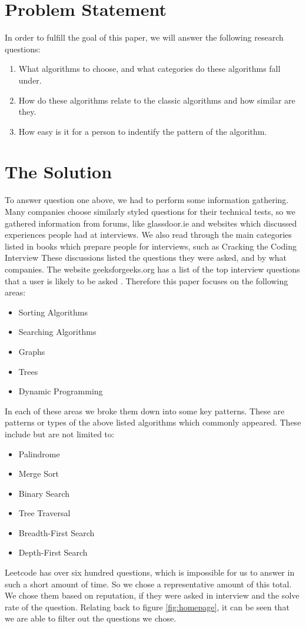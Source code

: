 \documentclass[10pt,twocolumn]{IEEEtran}
\begin{document}
\section{Problem Statement}
In order to fulfill the goal of this paper, we will answer the following research questions:
\begin{enumerate}
\item What algorithms to choose, and what categories do these algorithms fall under. 
\item How do these algorithms relate to the classic algorithms and how similar are they.
\item How easy is it for a person to indentify the pattern of the algorithm.
\end{enumerate}
\section{The Solution}
To answer question one above, we had to perform some information gathering. Many companies choose similarly styled questions for their technical tests, so we gathered information from forums, like glassdoor.ie \cite{glassdoor} and websites which discussed experiences people had at interviews. We also read through the main categories listed in books which prepare people for interviews, such as Cracking the Coding Interview \cite{mcdowell2015cracking} These discussions listed the questions they were asked, and by what companies. The website geeksforgeeks.org has a list of the top interview questions that a user is likely to be asked \cite{geeksalgos}. Therefore this paper focuses on the following areas:
\begin{itemize}
\item Sorting Algorithms
\item Searching Algorithms
\item Graphs
\item Trees
\item Dynamic Programming
\end{itemize}
In each of these areas we broke them down into some key patterns. These are patterns or types of the above listed algorithms which commonly appeared. These include but are not limited to:
\begin{itemize}
\item Palindrome
\item  Merge Sort
\item Binary Search
\item Tree Traversal
\item Breadth-First Search
\item Depth-First Search
\end{itemize} 
\par Leetcode has over six hundred questions, which is impossible for us to answer in such a short amount of time. So we chose a representative amount of this total. We chose them based on reputation, if they were asked in interview and the solve rate of the question. Relating back to figure \ref{fig:homepage}, it can be seen that we are able to filter out the questions we chose.
\end{document}
